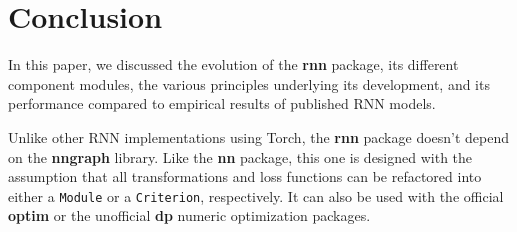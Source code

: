 \documentclass{article} %
\providecommand{\inlinecode}[1]{\texttt{#1}}
\begin{document}
\section{Conclusion}

In this paper, we discussed the evolution of the \textbf{rnn} package, its different component
modules, the various principles underlying its development, and its performance
compared to empirical results of published RNN models.

Unlike other RNN implementations using Torch, the \textbf{rnn} package 
doesn't depend on the \textbf{nngraph} library.
Like the \textbf{nn} package, this one is designed with the assumption that all
transformations and loss functions can be refactored 
into either a \inlinecode{Module} or a \inlinecode{Criterion}, respectively.
It can also be used with the official \textbf{optim} 
or the unofficial \textbf{dp} numeric optimization packages.



\end{document}
